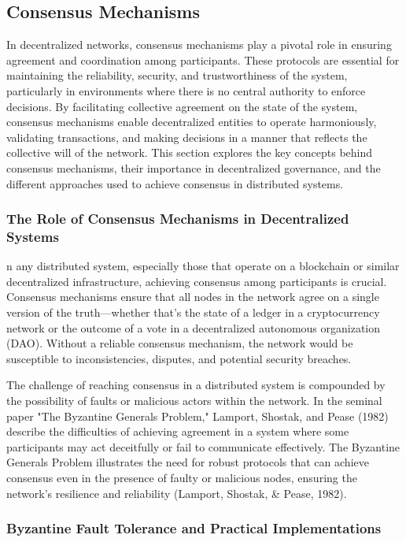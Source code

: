 \documentclass[12pt,twoside]{article}
\begin{document}
\subsection{Consensus Mechanisms}

In decentralized networks, consensus mechanisms play a pivotal role in ensuring agreement and coordination among participants. These protocols are essential for maintaining the reliability, security, and trustworthiness of the system, particularly in environments where there is no central authority to enforce decisions. By facilitating collective agreement on the state of the system, consensus mechanisms enable decentralized entities to operate harmoniously, validating transactions, and making decisions in a manner that reflects the collective will of the network. This section explores the key concepts behind consensus mechanisms, their importance in decentralized governance, and the different approaches used to achieve consensus in distributed systems.

\subsubsection{The Role of Consensus Mechanisms in Decentralized Systems}

n any distributed system, especially those that operate on a blockchain or similar decentralized infrastructure, achieving consensus among participants is crucial. Consensus mechanisms ensure that all nodes in the network agree on a single version of the truth—whether that’s the state of a ledger in a cryptocurrency network or the outcome of a vote in a decentralized autonomous organization (DAO). Without a reliable consensus mechanism, the network would be susceptible to inconsistencies, disputes, and potential security breaches.

The challenge of reaching consensus in a distributed system is compounded by the possibility of faults or malicious actors within the network. In the seminal paper "The Byzantine Generals Problem," Lamport, Shostak, and Pease (1982) describe the difficulties of achieving agreement in a system where some participants may act deceitfully or fail to communicate effectively. The Byzantine Generals Problem illustrates the need for robust protocols that can achieve consensus even in the presence of faulty or malicious nodes, ensuring the network’s resilience and reliability (Lamport, Shostak, & Pease, 1982).

\subsubsection{Byzantine Fault Tolerance and Practical Implementations}
\end{document}
